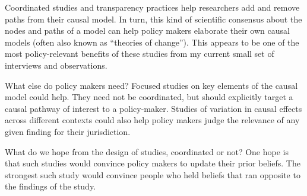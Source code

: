 \documentclass[
  11pt,
]{article}
\begin{document}
Coordinated studies and transparency practices help researchers add and
remove paths from their causal model. In turn, this kind of scientific
consensus about the nodes and paths of a model can help policy makers
elaborate their own causal models (often also known as ``theories of
change''). This appears to be one of the most policy-relevant benefits
of these studies from my current small set of interviews and
observations.

What else do policy makers need? Focused studies on key elements of the
causal model could help. They need not be coordinated, but should
explicitly target a causal pathway of interest to a policy-maker.
Studies of variation in causal effects across different contexts could
also help policy makers judge the relevance of any given finding for
their jurisdiction.

What do we hope from the design of studies, coordinated or not? One hope
is that such studies would convince policy makers to update their prior
beliefs. The strongest such study would convince people who held beliefs
that ran opposite to the findings of the study.

\printbibliography
\end{document}
